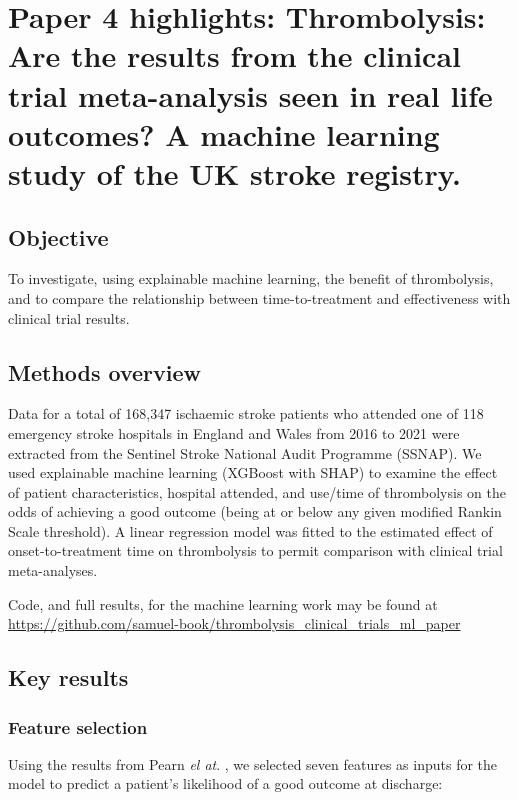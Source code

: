\section{Paper 4 highlights: Thrombolysis: Are the results from the clinical trial meta-analysis seen in real life outcomes?  A machine learning study of the UK stroke registry.\cite{pearn_thrombolysis_2024}}\label{sec:paper_4}

\subsection{Objective}

To investigate, using explainable machine learning, the benefit of thrombolysis, and to compare the relationship between time-to-treatment and effectiveness with clinical trial results.

\subsection{Methods overview}

Data for a total of 168,347 ischaemic stroke patients who attended one of 118 emergency stroke hospitals in England and Wales from 2016 to 2021 were extracted from the Sentinel Stroke National Audit Programme (SSNAP). We used explainable machine learning (XGBoost\cite{chen_xgboost_2016} with SHAP\cite{lundberg_unified_2017}) to examine the effect of patient characteristics, hospital attended, and use/time of thrombolysis on the odds of achieving a good outcome (being at or below any given modified Rankin Scale threshold). A linear regression model was fitted to the estimated effect of onset-to-treatment time on thrombolysis to permit comparison with clinical trial meta-analyses.

Code, and full results, for the machine learning work may be found at \url{https://github.com/samuel-book/thrombolysis_clinical_trials_ml_paper}

\subsection{Key results}

\subsubsection{Feature selection}

Using the results from Pearn \textit{el at}. \cite{pearn_are_2024}, we selected seven features as inputs for the model to predict a patient's likelihood of a good outcome at discharge:

